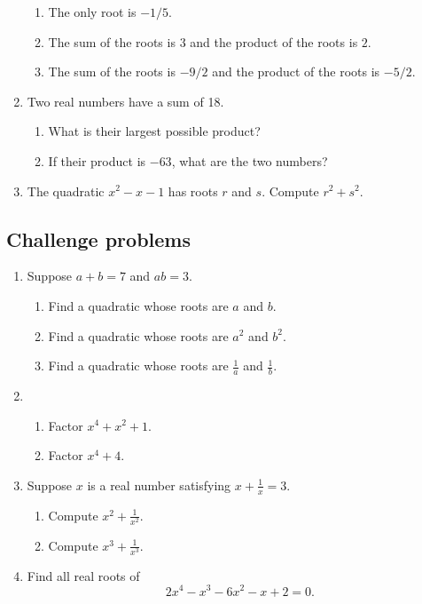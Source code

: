 \begin{enumerate}
\begin{enumerate}
\item The only root is $-1/5$.
\item The sum of the roots is $3$ and the product of the roots is $2$.
\item The sum of the roots is $-9/2$ and the product of the roots is $-5/2$.
\end{enumerate}
\item Two real numbers have a sum of 18.
\begin{enumerate}
\item What is their largest possible product?
\item If their product is $-63$, what are the two numbers?
\end{enumerate}
\item The quadratic $x^2 - x - 1$ has roots $r$ and $s$. Compute $r^2 + s^2$.
\end{enumerate}


\subsection{Challenge problems}

\begin{enumerate}[resume]
\item Suppose $a + b = 7$ and $ab = 3$.
\begin{enumerate}
\item Find a quadratic whose roots are $a$ and $b$.
\item Find a quadratic whose roots are $a^2$ and $b^2$.
\item Find a quadratic whose roots are $\frac{1}{a}$ and $\frac{1}{b}$.
\end{enumerate}
\item \begin{enumerate}
\item Factor $x^4 + x^2 + 1$.
\item Factor $x^4 + 4$.
\end{enumerate}
\item Suppose $x$ is a real number satisfying $x + \frac{1}{x} = 3$.
\begin{enumerate}
\item Compute $x^2 + \frac{1}{x^2}$.
\item Compute $x^3 + \frac{1}{x^3}$.
\end{enumerate}
\item Find all real roots of
\begin{equation*}
2x^4 - x^3 - 6x^2 - x + 2 = 0.
\end{equation*}
\end{enumerate}


